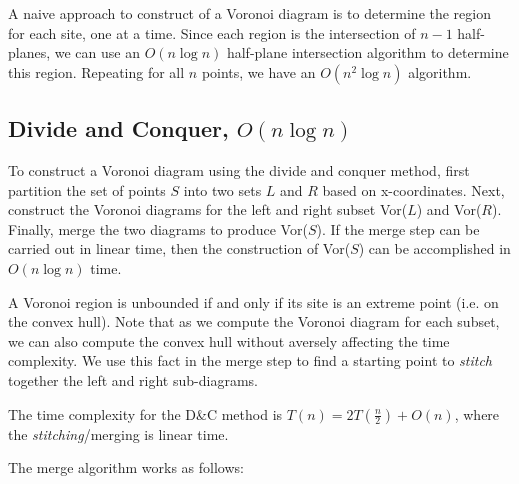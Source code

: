 \documentclass[12pt]{article}
\begin{document}
        A naive approach to construct of a Voronoi diagram is to determine the
        region for each site, one at a time.  Since each region is the
        intersection of $n-1$ half-planes, we can use an $O(n \log n)$
        half-plane intersection algorithm to determine this region.  Repeating
        for all $n$ points, we have an $O(n^2 \log n)$ algorithm.

    \subsection{Divide and Conquer, $O(n \log n)$}

        To construct a Voronoi diagram using the divide and conquer method,
        first partition the set of points $S$ into two sets $L$ and $R$ based
        on x-coordinates.  Next, construct the Voronoi diagrams for the left
        and right subset Vor($L$) and Vor($R$).  Finally, merge the two
        diagrams to produce Vor($S$).  If the merge step can be carried out in
        linear time, then the construction of Vor($S$) can be accomplished in
        $O(n \log n)$ time.


        A Voronoi region is unbounded if and only if its site is an extreme
        point (i.e. on the convex hull).  Note that as we compute the Voronoi
        diagram for each subset, we can also compute the convex hull without
        aversely affecting the time complexity.  We use this fact in the merge
        step to find a starting point to {\em stitch} together the left and
        right sub-diagrams. 

        The time complexity for the D\&C method is $T(n) = 2 T(\frac{n}{2}) + O(n)$, where the \emph{stitching}/merging is linear time.
        
        
        The merge algorithm works as follows:
\end{document}

